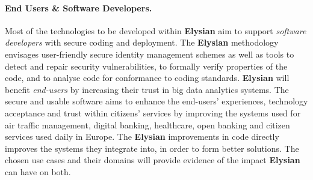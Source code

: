 \documentclass[a4paper,11pt]{article}
\newcommand{\project}[1]{\textbf{#1}\xspace}
\newcommand{\SECURITY}{\project{Elysian}}
\newcommand{\TheProject}{\SECURITY}
\begin{document}
\begin{mdframed}[backgroundcolor=blue!5]
\paragraph{End Users \& Software Developers.}
Most of the technologies to be developed within
\TheProject{}  aim to support \emph{software developers}
with secure coding and deployment. %
The \TheProject{} methodology envisages user-friendly secure identity management schemes as well as %
tools to detect and repair security vulnerabilities, to formally verify properties of the code, and to analyse code for conformance to coding standards. %
\TheProject{} will benefit \emph{end-users} by increasing their trust in big data analytics systems.
The secure and usable software aims to enhance the end-users' experiences, technology acceptance and trust within citizens' services by improving the systems used for air traffic management, digital banking, healthcare, open banking and citizen services used daily in Europe. The \TheProject{} improvements in code directly improves the systems they integrate into, in order to form better solutions.
The chosen use cases and their domains will provide evidence of the impact \TheProject{} can have on both.
\end{mdframed}


\end{document}
